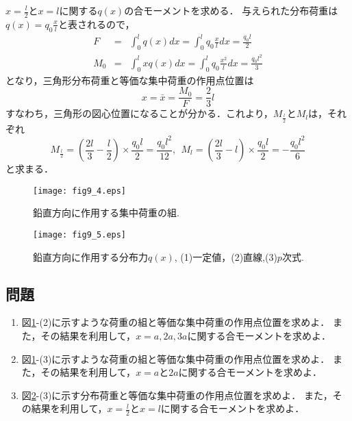 \documentclass[10pt,a4j]{jarticle}
\begin{document}
\begin{enumerate}
$x=\frac{l}{2}$と$x=l$に関する$q(x)$の合モーメントを求める．
与えられた分布荷重は$q(x)=q_0\frac{x}{l}$と表されるので，
\begin{eqnarray}
	F&= & \int _0^l q(x)dx = \int_0^l q_0 \frac{x}{l}dx=\frac{q_0l}{2}
	\label{eqn:}
	\\
	M_0&= & \int _0^l xq(x)dx = \int_0^l q_0 \frac{x^2}{l}dx=\frac{q_0l^2}{3}
	\label{eqn:}
\end{eqnarray}
となり，三角形分布荷重と等価な集中荷重の作用点位置は
\begin{equation}
	x=\bar x = \frac{M_0}{F}=\frac{2}{3}l
	\label{eqn:xbar_tri}
\end{equation}
すなわち，三角形の図心位置になることが分かる．これより，$M_{\frac{l}{2}}$と$M_l$は，それぞれ
\begin{equation}
	M_{\frac{l}{2}}=\left(\frac{2l}{3}-\frac{l}{2}\right) \times \frac{q_0l}{2} =\frac{q_0l^2}{12}, \ \ 
	M_l = \left(\frac{2l}{3}-l \right) \times \frac{q_0l}{2} =-\frac{q_0l^2}{6}
	\label{eqn:}
\end{equation}
と求まる．
\end{enumerate}
\begin{figure}[h]
	\begin{center}
	\texttt{[image: fig9\_4.eps]} 
	\end{center}
	\caption{
		鉛直方向に作用する集中荷重の組.
	} 
	\label{fig:fig9_4}
\end{figure}
\begin{figure}[h]
	\begin{center}
	\texttt{[image: fig9\_5.eps]} 
	\end{center}
	\caption{
		鉛直方向に作用する分布力$q(x)$, (1)一定値，(2)直線,(3)$p$次式.
	} 
	\label{fig:fig9_5}
\end{figure}
\subsection{問題}
\begin{enumerate}
\item
	図\ref{fig:fig9_4}-(2)に示すような荷重の組と等価な集中荷重の作用点位置を求めよ．
	また，その結果を利用して，$x=a,2a,3a$に関する合モーメントを求めよ．
\item
	図\ref{fig:fig9_4}-(3)に示すような荷重の組と等価な集中荷重の作用点位置を求めよ．
	また，その結果を利用して，$x=a$と$2a$に関する合モーメントを求めよ．
\item
	図\ref{fig:fig9_5}-(3)に示す分布荷重と等価な集中荷重の作用点位置を求めよ．
		また，その結果を利用して，$x=\frac{l}{2}$と$x=l$に関する合モーメントを求めよ．
\end{enumerate}
\end{document}
